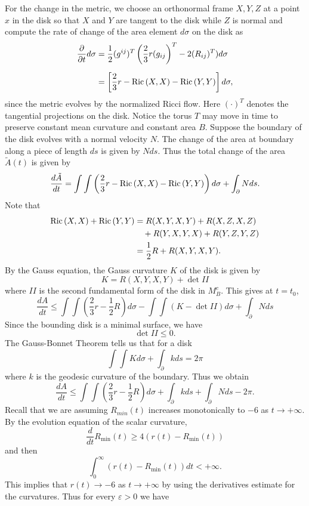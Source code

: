 For the change in the metric, we choose an orthonormal frame
$X,Y,Z$ at a point $x$ in the disk so that $X$ and $Y$ are tangent
to the disk while $Z$ is normal and compute the rate of change of
the area element $d\sigma$ on the disk as
\begin{align*}
\frac{\partial}{\partial t}d\sigma&  =
\frac{1}{2}(g^{ij})^T\left(\frac{2}{3}r(g_{ij}\right)^T-2(R_{ij})^T)d\sigma\\[2mm]
&  = \left[\frac{2}{3}r-{\rm Ric}\,(X,X)-{\rm Ric}\,(Y,Y)\right]d\sigma,
\end{align*}
since the metric evolves by the normalized Ricci flow. Here
$(\cdot)^T$ denotes the tangential projections on the disk. Notice
the torus $T$ may move in time to preserve constant mean curvature
and constant area $B$. Suppose the boundary of the disk evolves
with a normal velocity $N$. The change of the area at boundary
along a piece of length $ds$ is given by $Nds$. Thus the total
change of the area $\tilde{A}(t)$ is given by
$$
\frac{d\tilde{A}}{dt}
=\int\int\left(\frac{2}{3}r-{\rm Ric}\,(X,X)-{\rm Ric}\,(Y,Y)\right)d\sigma
+\int_\partial Nds.
$$
Note that
\begin{align*}
{\rm Ric}\,(X,X)+{\rm Ric}\,(Y,Y)&  = R(X,Y,X,Y)+R(X,Z,X,Z)\\
&\quad +R(Y,X,Y,X)+R(Y,Z,Y,Z)\\
&  = \frac{1}{2}R+R(X,Y,X,Y).
\end{align*}
By the Gauss equation, the Gauss curvature $K$ of the disk is
given by
$$
K=R(X,Y,X,Y)+\det II
$$
where $II$ is the second fundamental form of the disk in $M_B^c$.
This gives at $t=t_0$,
$$
\frac{dA}{dt}\leq\int\int\left(\frac{2}{3}r-\frac{1}{2}R\right)d\sigma
-\int\int(K-\det II)d\sigma+\int_\partial N ds
$$
Since the bounding disk is a minimal surface, we have
$$
\det II\leq 0.
$$
The Gauss-Bonnet Theorem tells us that for a disk
$$
\int\int Kd\sigma+\int_\partial k ds=2\pi
$$
where $k$ is the geodesic curvature of the boundary. Thus we
obtain \begin{equation} \frac{dA}{dt}\leq
\int\int\left(\frac{2}{3}r-\frac{1}{2}R\right)d\sigma+\int_\partial
kds+\int_\partial Nds -2\pi. %
\end{equation} Recall that we are assuming $R_{min}(t)$ increases
monotonically to $-6$ as $t\rightarrow +\infty$. By the evolution
equation of the scalar curvature,
$$
\frac{d}{dt}R_{\min}(t)\geq 4(r(t)-R_{\min}(t))
$$
and then
$$
\int_0^\infty (r(t)-R_{\min}(t))dt<+\infty.
$$
This implies that $r(t)\rightarrow -6$ as $t\rightarrow +\infty$
by using the derivatives estimate for the curvatures. Thus for
every $\varepsilon >0$ we have
